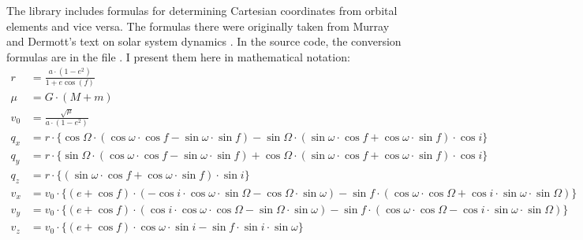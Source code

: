 The  library includes formulas for determining Cartesian coordinates from orbital elements and vice versa.
The formulas there were originally taken from Murray and Dermott's text on solar system dynamics \cite{SSD}.
In the  source code, the conversion formulas are in the file .
I present them here in mathematical notation:
\begin{align*}
r &= \frac{a \cdot (1 - e^2) }{1 + e \cos (f) } \\
\mu &= G \cdot (M + m) \\
v_0 &= \frac{\sqrt{ \mu}}{{a \cdot (1 - e^2)}} \\
q_x &= r \cdot \lbrace 
\cos \Omega \cdot (\cos \omega \cdot \cos f - \sin \omega \cdot \sin f) - 
\sin \Omega \cdot (\sin \omega \cdot \cos f +\cos \omega \cdot \sin f ) 
\cdot \cos i \rbrace \\
q_y &= r \cdot \lbrace 
\sin \Omega \cdot (\cos \omega \cdot \cos f - \sin \omega \cdot \sin f) + 
\cos \Omega \cdot (\sin \omega \cdot \cos f +\cos \omega \cdot \sin f )
 \cdot \cos i \rbrace \\
q_z &= r \cdot \lbrace (\sin \omega \cdot \cos f + \cos \omega \cdot \sin f) \cdot \sin i \rbrace \\
v_x &= v_0 \cdot \lbrace 
(e + \cos f) 
\cdot (-\cos i \cdot \cos \omega \cdot \sin \Omega - \cos \Omega \cdot \sin \omega) - 
\sin f \cdot  (\cos \omega \cdot \cos \Omega + \cos i \cdot \sin \omega \cdot \sin \Omega) 
\rbrace \\
v_y &= v_0 \cdot \lbrace 
(e + \cos f) 
\cdot (\cos i \cdot \cos \omega \cdot \cos \Omega - \sin \Omega \cdot \sin \omega) - 
\sin f \cdot  (\cos \omega \cdot \cos \Omega - \cos i \cdot \sin \omega \cdot \sin \Omega) 
\rbrace \\
v_z &= v_0 \cdot \lbrace 
(e + \cos f) \cdot \cos \omega \cdot \sin i - \sin f \cdot \sin i \cdot \sin \omega
\rbrace
\end{align*}

